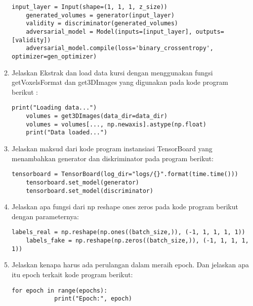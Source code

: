 \begin{enumerate}
\begin{lstlisting}[caption=Membuat dan Kompilasi Model Adversarial,label={lst:8.3}]
    input_layer = Input(shape=(1, 1, 1, z_size))
    generated_volumes = generator(input_layer)
    validity = discriminator(generated_volumes)
    adversarial_model = Model(inputs=[input_layer], outputs=[validity])
    adversarial_model.compile(loss='binary_crossentropy', optimizer=gen_optimizer)
\end{lstlisting}
\item
Jelaskan Ekstrak dan load data kursi dengan menggunakan fungsi getVoxelsFormat dan get3DImages yang digunakan pada kode program berikut :
\begin{lstlisting}[caption=Ekstraksi dan load dataset,label={lst:8.4}]
    print("Loading data...")
    volumes = get3DImages(data_dir=data_dir)
    volumes = volumes[..., np.newaxis].astype(np.float)
    print("Data loaded...")
\end{lstlisting}
\item
Jelaskan maksud dari kode program instansiasi TensorBoard yang menambahkan generator dan diskriminator pada program berikut:
\begin{lstlisting}[caption=Instansiasi tensorboard,label={lst:8.5}]
    tensorboard = TensorBoard(log_dir="logs/{}".format(time.time()))
    tensorboard.set_model(generator)
    tensorboard.set_model(discriminator)
\end{lstlisting}
\item
Jelaskan apa fungsi dari np reshape ones zeros pada kode program berikut dengan parameternya:
\begin{lstlisting}[caption=Pelabelan dataset,label={lst:8.6}]
    labels_real = np.reshape(np.ones((batch_size,)), (-1, 1, 1, 1, 1))
    labels_fake = np.reshape(np.zeros((batch_size,)), (-1, 1, 1, 1, 1))
\end{lstlisting}
\item
Jelaskan kenapa harus ada perulangan dalam meraih epoch. Dan jelaskan apa itu epoch terkait kode program berikut:
\begin{lstlisting}[caption=Setting Epoch,label={lst:8.7}]
        for epoch in range(epochs):
            print("Epoch:", epoch)


\end{lstlisting}
\end{enumerate}
